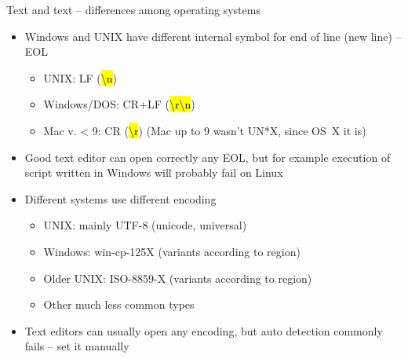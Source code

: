 \documentclass[compress, ucs, xelatex, 11pt, xcolor=svgnames,
  hyperref={
    bookmarks=true,
    unicode=true,
    colorlinks=true,
    pdftitle={Linux, command line and MetaCentrum},
    plainpages=false,
    pdfauthor={Vojtech Zeisek},
    pdfsubject={Course about use of Linux command line, writing shell scripts and using MetaCentrum of CESNET},
    pdfcreator={XeLaTeX},
    pdfkeywords={Linux, GNU, BASH, shell, command line, MetaCentrum},
    linkcolor=DarkRed,
    anchorcolor=DarkBlue,
    citecolor=Indigo,
    filecolor=NavyBlue,
    menucolor=DarkMagenta,
    urlcolor=DarkBlue,
    pdftex},
  url={hyphens, lowtilde} %
  ]{beamer}
\renewcommand{\texttt}[1]{\hl{\ttfamily #1}}
\begin{document}
\begin{frame}{Text and text -- differences among operating systems}
  \begin{itemize}
    \item Windows and UNIX have different internal symbol for end of line (new line) -- EOL
    \begin{itemize}
      \item UNIX: LF (\texttt{\textbackslash n})
      \item Windows/DOS: CR+LF (\texttt{\textbackslash r\textbackslash n})
      \item Mac v. < 9: CR (\texttt{\textbackslash r}) (Mac up to 9 wasn't UN*X, since OS~X it is)
    \end{itemize}
    \item Good text editor can open correctly any EOL, but for example execution of script written in Windows will probably fail on Linux
    \item Different systems use different encoding
    \begin{itemize}
      \item UNIX: mainly UTF-8 (unicode, universal)
      \item Windows: win-cp-125X (variants according to region)
      \item Older UNIX: ISO-8859-X (variants according to region)
      \item Other much less common types
    \end{itemize}
    \item Text editors can usually open any encoding, but auto detection commonly fails -- set it manually
  \end{itemize}
\end{frame}
\end{document}

